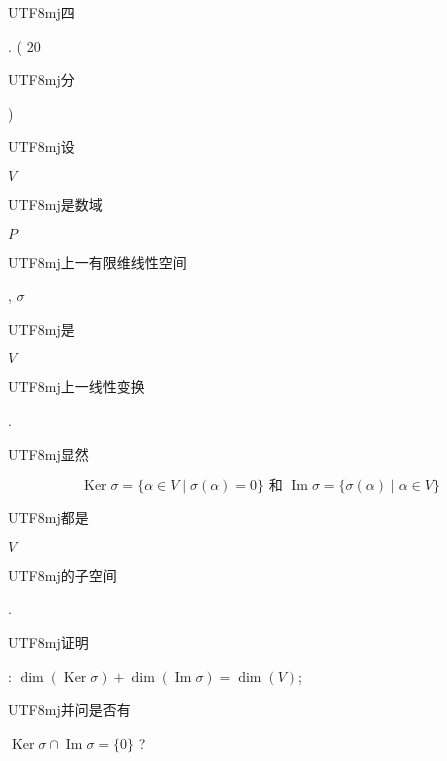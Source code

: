 \documentclass[10pt]{article}
\begin{document}
\begin{CJK}{UTF8}{mj}四\end{CJK}. ( 20 \begin{CJK}{UTF8}{mj}分\end{CJK}) \begin{CJK}{UTF8}{mj}设\end{CJK} $V$ \begin{CJK}{UTF8}{mj}是数域\end{CJK} $P$ \begin{CJK}{UTF8}{mj}上一有限维线性空间\end{CJK}, $\sigma$ \begin{CJK}{UTF8}{mj}是\end{CJK} $V$ \begin{CJK}{UTF8}{mj}上一线性变换\end{CJK}. \begin{CJK}{UTF8}{mj}显然\end{CJK}
$$
\operatorname{Ker} \sigma=\{\alpha \in V \mid \sigma(\alpha)=0\} \text { 和 } \operatorname{Im} \sigma=\{\sigma(\alpha) \mid \alpha \in V\}
$$
\begin{CJK}{UTF8}{mj}都是\end{CJK} $V$ \begin{CJK}{UTF8}{mj}的子空间\end{CJK}. \begin{CJK}{UTF8}{mj}证明\end{CJK}: $\operatorname{dim}(\operatorname{Ker} \sigma)+\operatorname{dim}(\operatorname{Im} \sigma)=\operatorname{dim}(V)$; \begin{CJK}{UTF8}{mj}并问是否有\end{CJK} $\operatorname{Ker} \sigma \cap \operatorname{Im} \sigma=\{0\}$ ?
\end{document}
